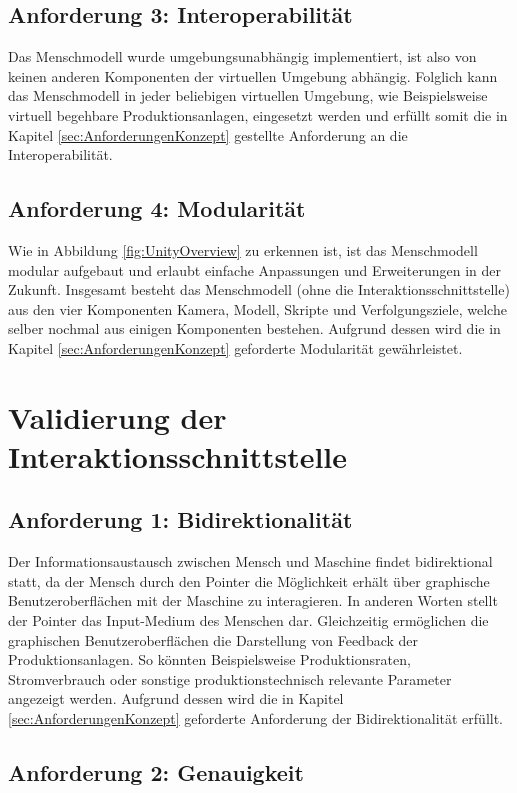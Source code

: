 \subsection{Anforderung 3: Interoperabilität}
Das Menschmodell wurde umgebungsunabhängig implementiert, ist also von keinen anderen Komponenten der virtuellen Umgebung abhängig. Folglich kann das Menschmodell in jeder beliebigen virtuellen Umgebung, wie Beispielsweise virtuell begehbare Produktionsanlagen, eingesetzt werden und erfüllt somit die in Kapitel \ref{sec:AnforderungenKonzept} gestellte Anforderung an die Interoperabilität.

\subsection{Anforderung 4: Modularität}
Wie in Abbildung \ref{fig:UnityOverview} zu erkennen ist, ist das Menschmodell modular aufgebaut und erlaubt einfache Anpassungen und Erweiterungen in der Zukunft. Insgesamt besteht das Menschmodell (ohne die Interaktionsschnittstelle) aus den vier Komponenten Kamera, Modell, Skripte und Verfolgungsziele, welche selber nochmal aus einigen Komponenten bestehen. Aufgrund dessen wird die in Kapitel \ref{sec:AnforderungenKonzept} geforderte Modularität gewährleistet.

\section{Validierung der Interaktionsschnittstelle}\label{sec:ValidInteraktion}

\subsection{Anforderung 1: Bidirektionalität}
Der Informationsaustausch zwischen Mensch und Maschine findet bidirektional statt, da der Mensch durch den Pointer die Möglichkeit erhält über graphische Benutzeroberflächen mit der Maschine zu interagieren. In anderen Worten stellt der Pointer das Input-Medium des Menschen dar. Gleichzeitig ermöglichen die graphischen Benutzeroberflächen die Darstellung von Feedback der Produktionsanlagen. So könnten Beispielsweise Produktionsraten, Stromverbrauch oder sonstige produktionstechnisch relevante Parameter angezeigt werden. Aufgrund dessen wird die in Kapitel \ref{sec:AnforderungenKonzept} geforderte Anforderung der Bidirektionalität erfüllt.
\subsection{Anforderung 2: Genauigkeit}

